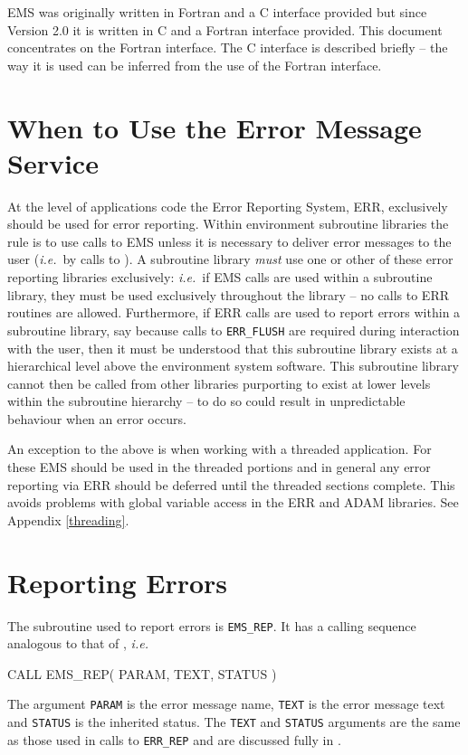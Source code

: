 \documentclass[twoside,11pt]{starlink}
\begin{document}
EMS was originally written in Fortran and a C interface provided but since
Version 2.0 it is written in C and a Fortran interface provided. This document
concentrates on the Fortran interface. The C interface is described briefly --
the way it is used can be inferred from the use of the Fortran interface.

\section{When to Use the Error
Message Service}
At the level of applications code the Error Reporting System, ERR, exclusively
should be used for error reporting.
Within environment subroutine libraries the rule is to use calls to EMS unless
it is necessary to deliver error messages to the user (\textit{i.e.}\ by
calls to
).
A subroutine library \emph{must}\/ use one or other of these error reporting
libraries exclusively: \textit{i.e.}\ if EMS calls are used within a
subroutine library, they must be used exclusively throughout the library --
no calls to ERR routines are allowed.
Furthermore, if ERR calls are used to report errors within a subroutine
library, say because calls to \texttt{ERR\_FLUSH} are required during
interaction with
the user, then it must be understood that this subroutine library exists at a
hierarchical level above the environment system software.
This subroutine library cannot then be called from other libraries purporting
to exist at lower levels within the subroutine hierarchy --
to do so could result in unpredictable behaviour when an error occurs.

An exception to the above is when working with a threaded application. For
these EMS should be used in the threaded portions and in general any error
reporting via ERR should be deferred until the threaded sections complete.
This avoids problems with global variable access in the ERR and ADAM
libraries. See Appendix \ref{threading}.

\section{Reporting Errors}
The subroutine used to report errors is \texttt{EMS\_REP}.
It has a calling sequence analogous to that of
, \textit{i.e.}
\begin{terminalv}
CALL EMS_REP( PARAM, TEXT, STATUS )
\end{terminalv}
The argument \texttt{PARAM} is the error message name, \texttt{TEXT}
is the error message text
and \texttt{STATUS} is the inherited status.
The \texttt{TEXT} and \texttt{STATUS}  arguments are the same as those used in
calls to \texttt{ERR\_REP} and are discussed fully in
.
\end{document}
